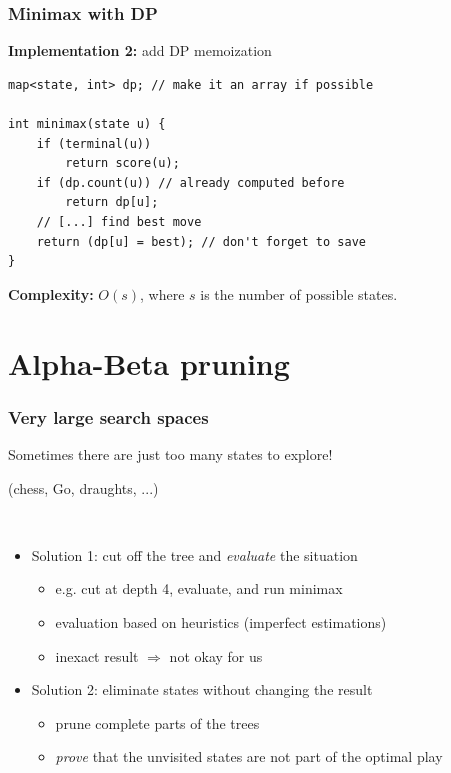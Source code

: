 \documentclass[12pt]{beamer}
\begin{document}
\begin{frame}[fragile]
\frametitle{Minimax with DP}
\textbf{Implementation 2:} add DP memoization
\begin{lstlisting}
map<state, int> dp; // make it an array if possible

int minimax(state u) {
    if (terminal(u))
        return score(u);
    if (dp.count(u)) // already computed before
        return dp[u];
    // [...] find best move
    return (dp[u] = best); // don't forget to save
}
\end{lstlisting}
\textbf{Complexity:} $O(s)$, where $s$ is the number of possible states.
\end{frame}

\section{Alpha-Beta pruning}
\begin{frame}
\frametitle{Very large search spaces}
Sometimes there are just too many states to explore!

\qquad \small{(chess, Go, draughts, ...)}

~

\begin{itemize}
\item Solution 1: cut off the tree and \emph{evaluate} the situation
    \begin{itemize}
    \item e.g. cut at depth 4, evaluate, and run minimax
    \item evaluation based on heuristics (imperfect estimations)
    \item inexact result $\Rightarrow$ not okay for us
    \end{itemize}
\item Solution 2: eliminate states without changing the result
    \begin{itemize}
    \item prune complete parts of the trees
    \item \emph{prove} that the unvisited states are not part of the optimal play
    \end{itemize}
\end{itemize}
\end{frame}
\end{document}
